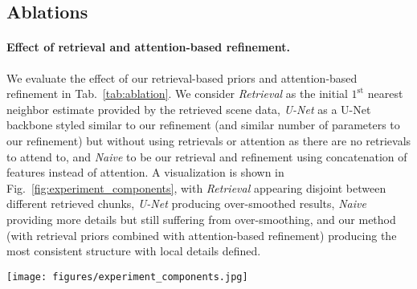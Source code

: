 \subsection{Ablations}
\paragraph{Effect of retrieval and attention-based refinement.}
We evaluate the effect of our retrieval-based priors and attention-based refinement in Tab.~\ref{tab:ablation}.
We consider \emph{Retrieval} as the initial $1^\mathrm{st}$ nearest neighbor estimate provided by the retrieved scene data, \emph{U-Net} as a U-Net backbone styled similar to our refinement (and similar number of parameters to our refinement) but without using retrievals or attention as there are no retrievals to attend to, and \emph{Naive} to be our retrieval and refinement using concatenation of features instead of attention.
A visualization is shown in Fig.~\ref{fig:experiment_components}, with \emph{Retrieval} appearing disjoint between different retrieved chunks, \emph{U-Net} producing over-smoothed results, \emph{Naive} providing more details but still suffering from over-smoothing, and our method (with retrieval priors combined with attention-based refinement) producing the most consistent structure with local details defined.

\begin{figure*}
	\centering
	\texttt{[image: figures/experiment\_components.jpg]}
	\caption{Qualitative evaluation of our method (\textit{Ours}) in comparison to $1^\mathrm{st}$ nearest neighbor retrieval (\textit{1-NN Retrieval}), a U-Net like network which doesn't use retrievals (\textit{U-Net}), and naive fusion of retrieved approximations during refinement (\textit{Naive}).}
	\label{fig:experiment_components}
	\vspace{-0.25cm}
\end{figure*}

